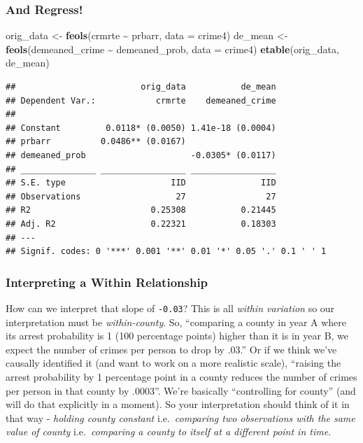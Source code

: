 \documentclass[
]{article}
\newenvironment{Shaded}{\begin{snugshade}}{\end{snugshade}}
\newcommand{\AttributeTok}[1]{\textcolor[rgb]{0.13,0.29,0.53}{#1}}
\newcommand{\FunctionTok}[1]{\textcolor[rgb]{0.13,0.29,0.53}{\textbf{#1}}}
\newcommand{\NormalTok}[1]{#1}
\newcommand{\OtherTok}[1]{\textcolor[rgb]{0.56,0.35,0.01}{#1}}
\newcommand{\SpecialCharTok}[1]{\textcolor[rgb]{0.81,0.36,0.00}{\textbf{#1}}}
\begin{document}
\hypertarget{and-regress}{%
\subsubsection{And Regress!}\label{and-regress}}

\begin{Shaded}
\begin{Highlighting}[]
\NormalTok{orig\_data }\OtherTok{\textless{}{-}} \FunctionTok{feols}\NormalTok{(crmrte }\SpecialCharTok{\textasciitilde{}}\NormalTok{ prbarr, }\AttributeTok{data =}\NormalTok{ crime4)}
\NormalTok{de\_mean }\OtherTok{\textless{}{-}} \FunctionTok{feols}\NormalTok{(demeaned\_crime }\SpecialCharTok{\textasciitilde{}}\NormalTok{ demeaned\_prob, }\AttributeTok{data =}\NormalTok{ crime4)}
\FunctionTok{etable}\NormalTok{(orig\_data, de\_mean)}
\end{Highlighting}
\end{Shaded}

\begin{verbatim}
##                         orig_data           de_mean
## Dependent Var.:            crmrte    demeaned_crime
##                                                    
## Constant         0.0118* (0.0050) 1.41e-18 (0.0004)
## prbarr          0.0486** (0.0167)                  
## demeaned_prob                     -0.0305* (0.0117)
## _______________ _________________ _________________
## S.E. type                     IID               IID
## Observations                   27                27
## R2                        0.25308           0.21445
## Adj. R2                   0.22321           0.18303
## ---
## Signif. codes: 0 '***' 0.001 '**' 0.01 '*' 0.05 '.' 0.1 ' ' 1
\end{verbatim}

\hypertarget{interpreting-a-within-relationship}{%
\subsubsection{Interpreting a Within
Relationship}\label{interpreting-a-within-relationship}}

How can we interpret that slope of \texttt{-0.03}? This is all
\emph{within variation} so our interpretation must be
\emph{within-county}. So, ``comparing a county in year A where its
arrest probability is 1 (100 percentage points) higher than it is in
year B, we expect the number of crimes per person to drop by .03.'' Or
if we think we've causally identified it (and want to work on a more
realistic scale), ``raising the arrest probability by 1 percentage point
in a county reduces the number of crimes per person in that county by
.0003''. We're basically ``controlling for county'' (and will do that
explicitly in a moment). So your interpretation should think of it in
that way - \emph{holding county constant} i.e.~\emph{comparing two
observations with the same value of county} i.e.~\emph{comparing a
county to itself at a different point in time}.
\end{document}
